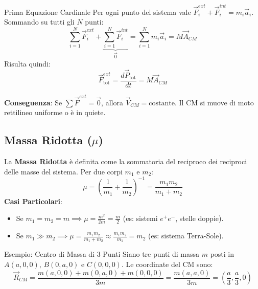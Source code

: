 \begin{teorema}{Prima Equazione Cardinale}
Per ogni punto del sistema vale $\vec{F}_i^{ext} + \vec{F}_i^{int} = m_i \vec{a}_i$. Sommando su tutti gli $N$ punti:
\begin{equation}
    \sum_{i=1}^N \vec{F}_i^{ext} + \underbrace{\sum_{i=1}^N \vec{F}_i^{int}}_{\vec{0}} = \sum_{i=1}^N m_i \vec{a}_i = M \vec{A}_{CM}
\end{equation}
Risulta quindi: 
\begin{equation}
    \vec{F}_{\text{tot}}^{ext} = \frac{d\vec{P}_{\text{tot}}}{dt} = M \vec{A}_{CM}
\end{equation}
\end{teorema}
\textbf{Conseguenza}: Se $\sum \vec{F}^{ext} = \vec{0}$, allora $\vec{V}_{CM} = \text{costante}$. Il CM si muove di moto rettilineo uniforme o è in quiete.

\subsection{Massa Ridotta ($\mu$)}
La \textbf{Massa Ridotta} è definita come la sommatoria del reciproco dei reciproci delle masse del sistema. Per due corpi $m_1$ e $m_2$:
\begin{equation}
    \mu = \left( \frac{1}{m_1} + \frac{1}{m_2} \right)^{-1} = \frac{m_1 m_2}{m_1 + m_2}
\end{equation}
\textbf{Casi Particolari}:
\begin{itemize}
    \item Se $m_1 = m_2 = m \implies \mu = \frac{m^2}{2m} = \frac{m}{2}$ (es: sistemi $e^+e^-$, stelle doppie).
    \item Se $m_1 \gg m_2 \implies \mu = \frac{m_1 m_2}{m_1 + m_2} \approx \frac{m_1 m_2}{m_1} = m_2$ (es: sistema Terra-Sole).
\end{itemize}

\begin{esercizio}{Esempio: Centro di Massa di 3 Punti}
Siano tre punti di massa $m$ posti in $A(a,0,0)$, $B(0,a,0)$ e $C(0,0,0)$.
Le coordinate del CM sono:
\begin{equation}
    \vec{R}_{CM} = \frac{m(a,0,0) + m(0,a,0) + m(0,0,0)}{3m} = \frac{m(a, a, 0)}{3m} = \left( \frac{a}{3}, \frac{a}{3}, 0 \right)
\end{equation}
\end{esercizio}

